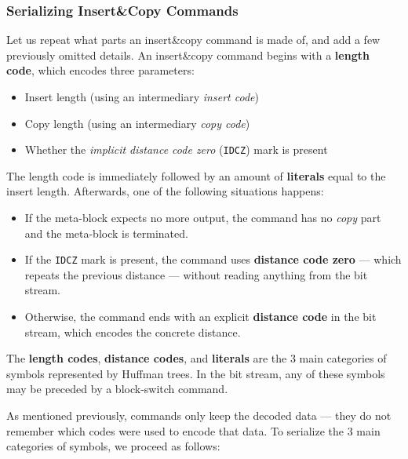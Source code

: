 \documentclass[english,master,dept460,male,cpp,cpdeclaration]{diploma}
\newcommand{\nosep}{\itemsep0em}
\begin{document}
		\subsubsection{Serializing Insert\&Copy Commands}
		\label{sec:serializing-ic-commands}
		
		Let us repeat what parts an insert\&copy command is made of, and add a few previously omitted details. An insert\&copy command begins with a \textbf{length code}, which encodes three parameters:
		
		\begin{itemize} \nosep
			\item Insert length (using an intermediary \emph{insert code})
			\item Copy length (using an intermediary \emph{copy code})
			\item Whether the \emph{implicit distance code zero} (\verb|IDCZ|) mark is present
		\end{itemize}
		
		\noindent
		The length code is immediately followed by an amount of \textbf{literals} equal to the insert length. Afterwards, one of the following situations happens:
		
		\begin{itemize} \nosep
			\item If the meta-block expects no more output, the command has no \emph{copy} part and the meta-block is terminated.
			\item If the \verb|IDCZ| mark is present, the command uses \textbf{distance code zero} --- which repeats the previous distance --- without reading anything from the bit stream.
			\item Otherwise, the command ends with an explicit \textbf{distance code} in the bit stream, which encodes the concrete distance.
		\end{itemize}
		
		\noindent
		The \textbf{length codes}, \textbf{distance codes}, and \textbf{literals} are the 3 main categories of symbols represented by Huffman trees. In the bit stream, any of these symbols may be preceded by a block-switch command.
		
		As mentioned previously, commands only keep the decoded data --- they do not remember which codes were used to encode that data. To serialize the 3 main categories of symbols, we proceed as follows:
		
\end{document}
